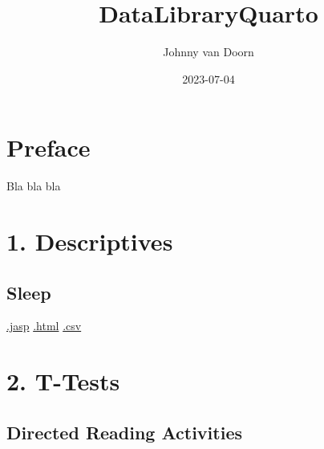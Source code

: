 \documentclass[
  letterpaper,
  DIV=11,
  numbers=noendperiod]{scrreprt}
\title{DataLibraryQuarto}
\author{Johnny van Doorn}
\date{2023-07-04}
\renewcommand*\contentsname{Table of contents}
\newcommand\contentsname{Table of contents}
\begin{document}
\maketitle
\ifdefined\Shaded\renewenvironment{Shaded}{\begin{tcolorbox}[frame hidden, boxrule=0pt, interior hidden, borderline west={3pt}{0pt}{shadecolor}, sharp corners, breakable, enhanced]}{\end{tcolorbox}}\fi

\renewcommand*\contentsname{Table of contents}
{
\hypersetup{linkcolor=}
\setcounter{tocdepth}{2}
\tableofcontents
}

\hypertarget{preface}{%
\chapter*{Preface}\label{preface}}


Bla bla bla


\hypertarget{descriptives}{%
\chapter{1. Descriptives}\label{descriptives}}

\hypertarget{sleep}{%
\section{Sleep}\label{sleep}}

\textbar{}
\href{https://github.com/jasp-stats/jasp-data-library/raw/main/Sleep/Sleep.jasp}{.jasp}
\textbar{}
\href{https://htmlpreview.github.io/?https://github.com/jasp-stats/jasp-data-library/blob/main/Sleep/index.html}{.html}
\textbar{}
\href{https://raw.githubusercontent.com/jasp-stats/jasp-data-library/main/Sleep/Sleep.csv}{.csv}


\hypertarget{t-tests}{%
\chapter{2. T-Tests}\label{t-tests}}

\hypertarget{directed-reading-activities}{%
\section{Directed Reading
Activities}\label{directed-reading-activities}}
\end{document}

